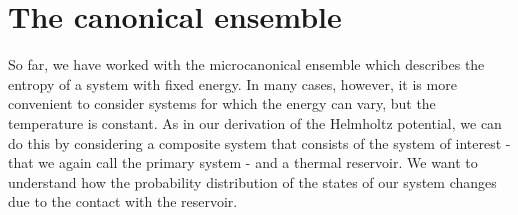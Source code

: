 \documentclass[a4paper, draft]{article}
\theoremstyle{own}
\theoremstyle{remark}
\begin{document}
\section{The canonical ensemble}
\label{sec:canonicaldistribution} 

So far, we have worked with the microcanonical ensemble which describes the entropy of a system with fixed energy. In many cases, however, it is more convenient to consider systems for which the energy can vary, but the temperature is constant. As in our derivation of the Helmholtz potential, we can do this by considering a composite system that consists of the system of interest - that we again call the primary system - and a thermal reservoir. We want to understand how the probability distribution of the states of our system changes due to the contact with the reservoir.
\end{document}
